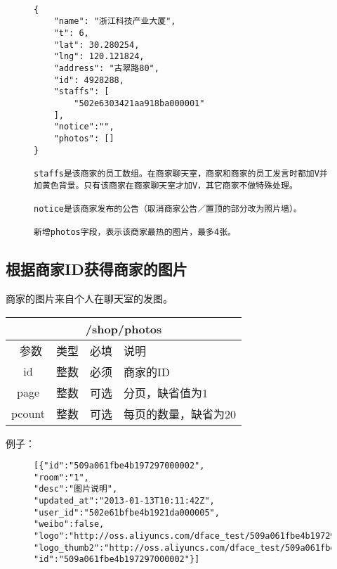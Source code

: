\documentclass[cs4size]{ctexartutf8}
\begin{document}
\begin{figure}[H]
\begin{verbatim}

{
    "name": "浙江科技产业大厦",
    "t": 6,
    "lat": 30.280254,
    "lng": 120.121824,
    "address": "古翠路80",
    "id": 4928288,
    "staffs": [
        "502e6303421aa918ba000001"
    ],
    "notice":"",
    "photos": []
}

staffs是该商家的员工数组。在商家聊天室，商家和商家的员工发言时都加V并加黄色背景。只有该商家在商家聊天室才加V，其它商家不做特殊处理。

notice是该商家发布的公告（取消商家公告／置顶的部分改为照片墙）。

新增photos字段，表示该商家最热的图片，最多4张。

\end{verbatim}
\end{figure}



\subsection{根据商家ID获得商家的图片}
商家的图片来自个人在聊天室的发图。

\begin{table}[H]
   \begin{center}
\begin{tabular}{|c|c|c|p{12cm}|}
\hline
\multicolumn{4}{|c|}{/shop/photos} \\
\hline\hline
 \  参数  & 类型 & 必填 &  说明  \\
\hline
 id  & 整数 & 必须 & 商家的ID\\
   \hline
 page  & 整数 & 可选 & 分页，缺省值为1\\ 
 \hline
 pcount  & 整数 & 可选 & 每页的数量，缺省为20\\ 
\hline
\end{tabular}
   \end{center}
\end{table}

例子：

\begin{figure}[H]
\begin{verbatim}
[{"id":"509a061fbe4b197297000002",
"room":"1",
"desc":"图片说明",  
"updated_at":"2013-01-13T10:11:42Z",
"user_id":"502e61bfbe4b1921da000005",
"weibo":false,
"logo":"http://oss.aliyuncs.com/dface_test/509a061fbe4b197297000002/0.jpg",
"logo_thumb2":"http://oss.aliyuncs.com/dface_test/509a061fbe4b197297000002/t2_0.jpg",
"id":"509a061fbe4b197297000002"}]

\end{verbatim}
\end{figure}
\end{document}

